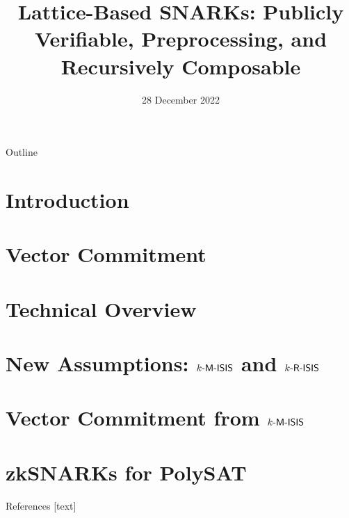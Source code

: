 \documentclass{beamer}
\title{Lattice-Based SNARKs: Publicly Verifiable, Preprocessing, and Recursively Composable}
\date{28 December 2022}
\begin{document}
	\begin{frame}
		\titlepage
	\end{frame}
	
	\begin{frame}{Outline}
		\tableofcontents
	\end{frame}
	
	\section{Introduction}
	
	
	\section{Vector Commitment}
	
	
	\section{Technical Overview}
	
	
	\section{New Assumptions: $k\textsf{-M-ISIS}$ and $k\textsf{-R-ISIS}$}
	
	
	\section{Vector Commitment from $k\textsf{-M-ISIS}$}
	
	
	\section{zkSNARKs for PolySAT}
	
	
	\begin{frame}[allowframebreaks]{References}
		
		
		
	\end{frame}
	
\end{document}
